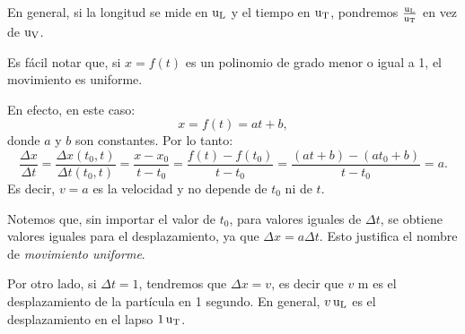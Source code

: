 En general, si la longitud se mide en $\operatorname{u_L}$ y el tiempo en $\operatorname{u_T}$, pondremos $\frac{\operatorname{u_L}}{\operatorname{u_T}}$ en
vez de $\operatorname{u_V}$.

Es fácil notar que, si $x=f(t)$ es un polinomio de grado menor o igual a 1, el movimiento es
uniforme.

En efecto, en este caso:
\[
x=f(t)=at+b,
\]
donde $a$ y $b$ son constantes. Por lo tanto:
\begin{equation*}
\frac{\Delta x}{\Delta t}= \frac{\Delta x(t_0,t)}{\Delta t(t_0,t)}=\frac{x-x_0}{t-t_0}=\frac{f(t)-f(t_0)}{t-t_0}%
=\frac{(at+b)-(at_0+b)}{t-t_0}=a.
\end{equation*}
Es decir, $v=a$ es la velocidad y no depende de $t_0$ ni de $t$.

Notemos que, sin importar el valor de $t_0$, para valores iguales de $\Delta t$, se obtiene valores
iguales para el desplazamiento, ya que  $\Delta x= a\Delta t$. Esto justifica el nombre de
\emph{movimiento uniforme}.

Por otro lado, si $\Delta t =1$, tendremos que  $\Delta x= v$, es decir que $v$ m es el
desplazamiento de la partícula en 1 segundo. En general, $v \operatorname{u_L}$ es el desplazamiento en el lapso
$1 \operatorname{u_T}$.

